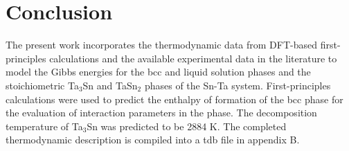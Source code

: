 \section{Conclusion}

The present work incorporates the thermodynamic data from DFT-based first-principles calculations and the available experimental data in the literature to model the Gibbs energies for the bcc and liquid solution phases and the stoichiometric Ta$_3$Sn and TaSn$_2$ phases of the Sn-Ta system.  First-principles calculations were used to predict the enthalpy of formation of the bcc phase for the evaluation of interaction parameters in the phase. The decomposition temperature of Ta$_3$Sn was predicted to be 2884 K. The completed thermodynamic description is compiled into a tdb file in appendix B.

\newpage
